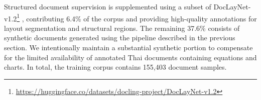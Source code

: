 \documentclass[]{typhoon} %
\begin{document}
Structured document supervision is supplemented using a subset of DocLayNet-v1.2\footnote{\url{https://huggingface.co/datasets/docling-project/DocLayNet-v1.2}} \citep{doclaynet2022}, contributing 6.4\% of the corpus and providing high-quality annotations for layout segmentation and structural regions. The remaining 37.6\% consists of synthetic documents generated using the pipeline described in the previous section. We intentionally maintain a substantial synthetic portion to compensate for the limited availability of annotated Thai documents containing equations and charts. In total, the
training corpus contains 155,403 document samples.






\end{document}
